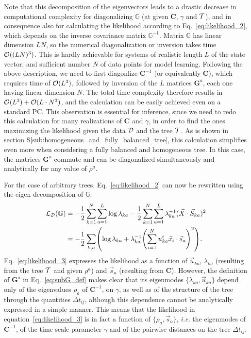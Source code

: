 \documentclass[preprint,amsmath,amssymb,superscriptaddress,showpacs,pre]{revtex4-1}
\let\originalleft\left
\let\originalright\right
\renewcommand{\left}{\mathopen{}\mathclose\bgroup\originalleft}
\renewcommand{\right}{\aftergroup\egroup\originalright}
\def\vx{\vec x}
\newcommand{\iC}{\bm{C}^{-1}}
\newcommand{\vsa}{\vec{s}_a}
\newcommand{\vuka}{\vec{u}_{ka}}
\newcommand{\sref}[1]{S\ref{#1}}
\begin{document}
Note that this decomposition of the eigenvectors leads to a drastic decrease in computational complexity for diagonalizing $\mathbb{G}$ (at given $\bm C$, $\gamma$ and $\cal T$), and in consequence also for calculating the likelihood according to Eq.~\eqref{eq:likelihood_2}, which depends on the inverse covariance matrix $\mathbb{G}^{-1}$. Matrix $\mathbb{G}$ has linear dimension $LN$, so the numerical diagonalization or inversion takes time ${\cal O}( (L N)^3)$. This is hardly achievable for systems of realistic length $L$ of the state vector, and sufficient number $N$ of data points for model learning. Following the above description, we need to first diagonlize $\bm C^{-1}$ (or equivalently $\bm C$), which requires time of ${\cal O}(L^3)$, followed by inversion of the $L$ matrices ${\bm G}^a$, each one having linear dimension $N$. The total time complexity therefore results in ${\cal O}(L^3) + {\cal O}(L\cdot N^3)$, and the calculation can be easily achieved even on a standard PC. This observation is essential for inference, since we need to redo this calculation for many realizations of $\bm C$ and $\gamma$, in order to find the ones maximizing the likelihood given the data $\cal D$ and the tree $\cal T$. As is shown in section \sref{sub:homogeneous_and_fully_balanced_tree}, this calculation simplifies even more when considering a fully balanced and homogeneous tree. In this case, the matrices $\bm G^a$ commute and can be diagonalized simultaneously and analytically for any value of $\rho^a$.

For the case of arbitrary trees, Eq.~\eqref{eq:likelihood_2} can now be rewritten using the eigen-decomposition of $\mathbb{G}$: 
\begin{equation}
	\begin{split}
		\mathcal{L}_{\mathcal{D}}(\mathbb{G}) &= -\frac 1 2 \sum_{k=1}^N\sum_{a=1}^L \log\lambda_{ka} - \frac 1 2 \sum_{k=1}^N\sum_{a=1}^L \lambda_{ka}^{-1}(\vec{X}\cdot \vec{S}_{ka})^2\\
		&= -\frac 1 2 \sum_{k,a} \left(\log\lambda_{ka} + \lambda_{ka}^{-1}	\left(\sum_{i=1}^N u_{ka}^i\vx_i\cdot\vsa\right)^2 \right).
	\end{split}
	\label{eq:likelihood_3}
\end{equation}
Eq.~\eqref{eq:likelihood_3} expresses the likelihood as a function of $\vuka$, $\lambda_{ka}$ (resulting from the tree $\cal T$ and given $\rho^a$) and $\vsa$ (resulting from $\bm C$). 
However, the definition of $\bm G^a$ in Eq.~\eqref{eq:subG_def} makes clear that its eigenmodes $\{\lambda_{ka}, \vuka \}$ depend only of the eigenvalues $\rho_a$ of $\iC$, on $\gamma$, as well as of the structure of the tree through the quantities $\Delta t_{ij}$, although this dependence cannot be analytically expressed in a simple manner. 
This means that the likelihood in equation~\eqref{eq:likelihood_3} is in fact a function of $\{\rho_a, \vsa\}$, \emph{i.e.} the eigenmodes of $\iC$, of the time scale parameter $\gamma$ and of the pairwise distances on the tree $\Delta t_{ij}$.
\end{document}
